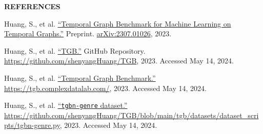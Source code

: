 \documentclass[10pt, letterpaper]{article}
\renewcommand{\section}[1]{%
	    \vspace{\parskip}
		{\large \bfseries\uppercase{#1}}
}
\begin{document}

\section{References}

\begingroup

\renewcommand{\section}[2]{}%

\begin{thebibliography}{3}
	
Huang, S., et al.
\href{https://doi.org/10.48550/arXiv.2307.01026}
{``Temporal Graph Benchmark for Machine Learning on Temporal 
Graphs.''}
Preprint. \url{arXiv:2307.01026}, 2023.
	
Huang, S., et al. 
\href{https://github.com/shenyangHuang/TGB}
{``TGB.''}
GitHub Repository. \url{https://github.com/shenyangHuang/TGB}, 2023. 
Accessed May 14, 2024.

Huang, S., et al.
\href{https://tgb.complexdatalab.com/}
{``Temporal Graph Benchmark.''}
\url{https://tgb.complexdatalab.com/}, 2023.
Accessed May 14, 2024.

Huang, S., et al.
\href{https://github.com/shenyangHuang/TGB/blob/main/tgb/datasets/dataset_scripts/tgbn-genre.py}
{``{\tt{tgbn-genre}} dataset.''}
\url{https://github.com/shenyangHuang/TGB/blob/main/tgb/datasets/dataset_scripts/tgbn-genre.py},
 2023. 
Accessed May 14, 2024.
	
\end{thebibliography}

\endgroup	
	
\end{document}
